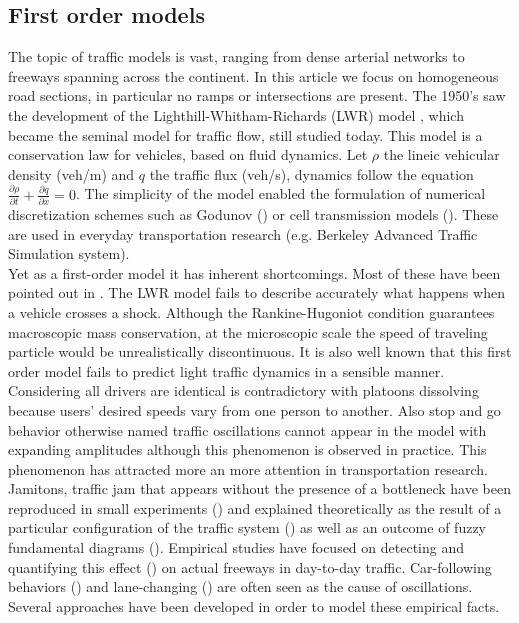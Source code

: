 \documentclass[preprint]{elsarticle}
\begin{document}
\subsection{First order models}
The topic of traffic models is vast, ranging from dense arterial networks
to freeways spanning across the continent. In this article we focus on homogeneous road
sections, in particular no ramps or intersections are present. The
1950\textquoteright s saw the development of the Lighthill-Whitham-Richards
(LWR) model \cite{LW,Richards}, which became the seminal model for
traffic flow, still studied today. This model is a conservation law
for vehicles, based on fluid dynamics. Let $\rho$ the lineic vehicular
density (veh/m) and $q$ the traffic flux (veh/s), dynamics follow
the equation $\frac{\partial\rho}{\partial t}+\frac{\partial q}{\partial x}=0$.
The simplicity of the model enabled the formulation of numerical discretization
schemes such as Godunov (\cite{godunov,Osher}) or cell transmission
models (\cite{daganzo1994cell,daganzo1995cell}). These are used in
everyday transportation research (e.g. Berkeley Advanced Traffic
Simulation system).\\
Yet as a first-order model it has inherent shortcomings. Most of these
have been pointed out in \cite{Dag_requiem}. The LWR model fails
to describe accurately what happens when a vehicle crosses a shock.
Although the Rankine-Hugoniot condition guarantees macroscopic mass
conservation, at the microscopic scale the speed of traveling particle
would be unrealistically discontinuous. It is also well known that this first order
model fails to predict light traffic dynamics in a sensible manner. Considering
all drivers are identical is contradictory with platoons dissolving because
users' desired speeds vary from one person to another. Also stop and go
behavior otherwise named traffic oscillations cannot appear in the
model with expanding amplitudes although this phenomenon is observed
in practice. This phenomenon has attracted more an more attention
in transportation research. Jamitons, traffic jam that appears without
the presence of a bottleneck have been reproduced in small experiments
(\cite{Jamitons2008,Flynn08onjamitons}) and explained theoretically
as the result of a particular configuration of the traffic system
(\cite{Flynn09self-sustainednonlinear}) as well as an outcome of
fuzzy fundamental diagrams (\cite{Jamitons-multi-valued-fund}). Empirical
studies have focused on detecting and quantifying this effect (\cite{zielke2008empirical})
on actual freeways in day-to-day traffic. Car-following behaviors
(\cite{Mauch02freewaytraffic}) and lane-changing (\cite{lanechangin2005,lanechanging2007})
are often seen as the cause of oscillations. Several approaches have
been developed in order to model these empirical facts.
\end{document}

